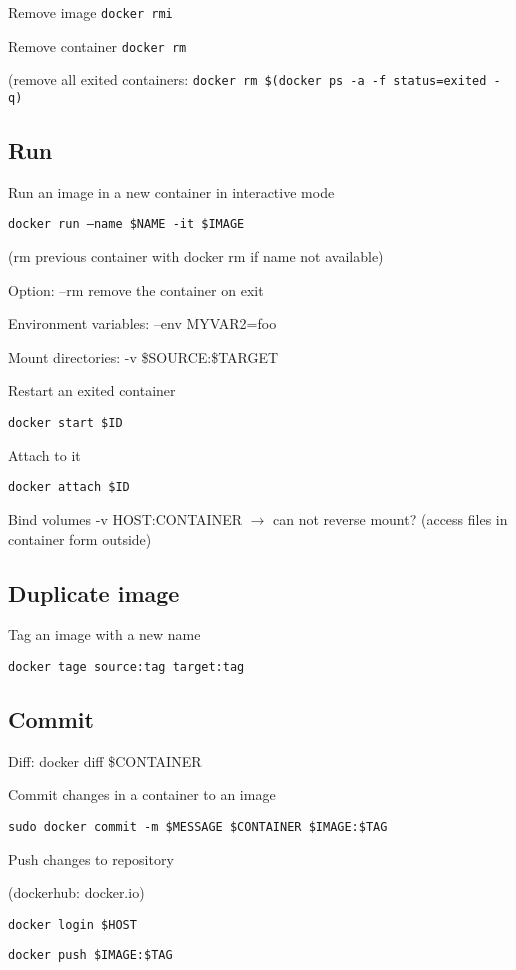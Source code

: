 Remove image \texttt{docker rmi}

Remove container \texttt{docker rm}

(remove all exited containers: \texttt{docker rm \$(docker ps -a -f status=exited -q)}


\subsection*{Run}


Run an image in a new container in interactive mode

\texttt{docker run --name \$NAME -it \$IMAGE}

(rm previous container with docker rm if name not available)

Option: --rm remove the container on exit

Environment variables: --env MYVAR2=foo

Mount directories: -v \$SOURCE:\$TARGET

Restart an exited container

\texttt{docker start \$ID}

Attach to it

\texttt{docker attach \$ID}

Bind volumes -v HOST:CONTAINER
$\rightarrow$ can not reverse mount? (access files in container form outside)


\subsection*{Duplicate image}


Tag an image with a new name

\texttt{docker tage source:tag target:tag}

\subsection*{Commit}

Diff: docker diff \$CONTAINER

Commit changes in a container to an image

\texttt{sudo docker commit -m \$MESSAGE \$CONTAINER \$IMAGE:\$TAG}

\bigskip

Push changes to repository

(dockerhub: docker.io)

\texttt{docker login \$HOST}

\texttt{docker push \$IMAGE:\$TAG}



